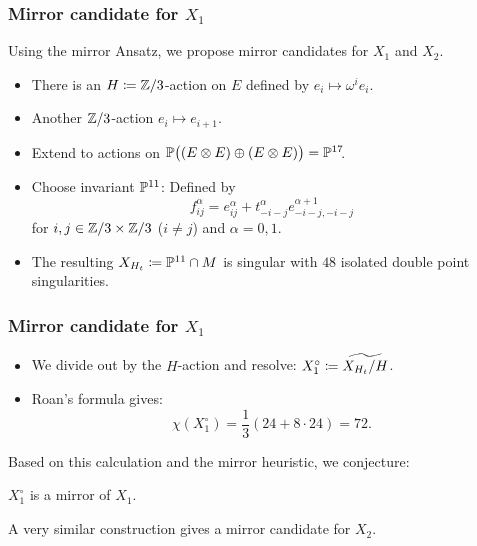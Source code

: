 \begin{frame}
\frametitle{Mirror candidate for $X_1$}

Using the mirror Ansatz, we propose mirror candidates for $X_1$ and $X_2$.

\begin{itemize}[<+->]
	\item
	There is an $H \defeq \Z/3$-action on $E$ defined by $e_i \mapsto \omega^i e_i$.

	\item
	Another $\Z/3$-action $e_i \mapsto e_{i + 1}$.

	\item
	Extend to actions on $\P\big((E \otimes E) \oplus (E \otimes E)\big) = \P^{17}\mkern-4mu$.

	\item
	Choose invariant $\P^{11}$: Defined by
	\[
	    f_{ij}^\alpha = e_{ij}^\alpha + t_{-i-j}^\alpha e_{-i-j,-i-j}^{\alpha+1}
	\]
	for $i,j \in \Z/3 \times \Z/3$ ($i \neq j$) and $\alpha = 0,1$.

	\item
	The resulting $X_{H_t} \defeq \P^{11} \cap M$ is singular with $48$ isolated double point singularities.
\end{itemize}

\end{frame}

\begin{frame}
\frametitle{Mirror candidate for $X_1$}

\begin{itemize}
	\item We divide out by the $H$-action and resolve: $X_1^\circ \defeq \widetilde{X_{H_t}/H}$.
	\pause
	\item Roan's formula gives:
	\[
	    \chi(X_1^\circ) = \frac{1}{3} \left(24 + 8 \cdot 24\right) = 72.
	\]
\end{itemize}

Based on this calculation and the mirror heuristic, we conjecture:

\begin{conjecture}
    $X_1^\circ$ is a mirror of $X_1$.
\end{conjecture}

\pause
\begin{remark}
    A very similar construction gives a mirror candidate for $X_2$.
\end{remark}

\end{frame}
